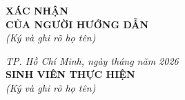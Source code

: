 \documentclass[14pt]{article}
\begin{document}
\pagebreak

\renewcommand{\refname}{Tài liệu tham khảo}



\vspace{2cm}

\noindent
\begin{minipage}[t]{0.48\textwidth}
    \centering
    \textbf{XÁC NHẬN }\\[4pt]
    \textbf{CỦA NGƯỜI HƯỚNG DẪN}\\[4pt]
    \textit{(Ký và ghi rõ họ tên)}\vspace{3cm}

\end{minipage}%
\hfill
\begin{minipage}[t]{0.48\textwidth}
    \centering
    \textit{TP. Hồ Chí Minh, ngày \hspace{0.1cm} tháng \hspace{0.1cm} năm 2026}\\[4pt]
    \textbf{SINH VIÊN THỰC HIỆN}\\[4pt]
    \textit{(Ký và ghi rõ họ tên)}\\[3cm]
\end{minipage}
\end{document}
